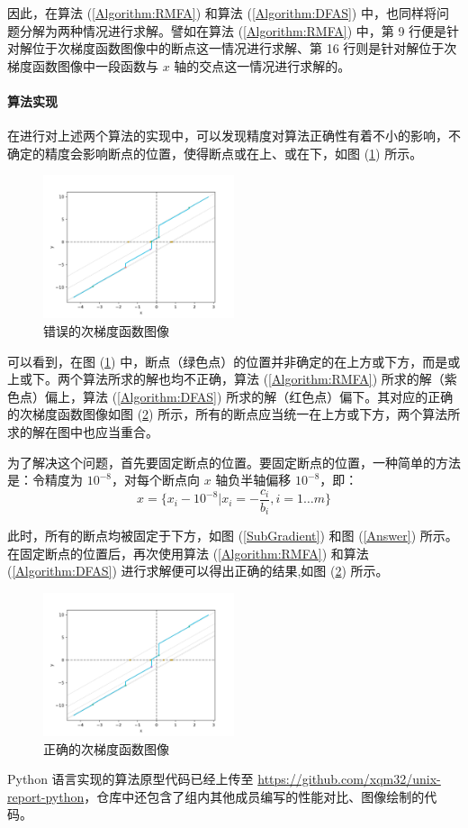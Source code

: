因此，在算法 (\ref{Algorithm:RMFA}) 和算法 (\ref{Algorithm:DFAS}) 中，也同样将问题分解为两种情况进行求解。譬如在算法 (\ref{Algorithm:RMFA}) 中，第 9 行便是针对解位于次梯度函数图像中的断点这一情况进行求解、第 16 行则是针对解位于次梯度函数图像中一段函数与 $x$ 轴的交点这一情况进行求解的。

\paragraph{算法实现}

在进行对上述两个算法的实现中，可以发现精度对算法正确性有着不小的影响，不确定的精度会影响断点的位置，使得断点或在上、或在下，如图 (\ref{Wrong}) 所示。
\begin{figure}[htb]
    \centering
    \includegraphics[width=0.5\textwidth]{figures/Wrong.png}
    \caption{错误的次梯度函数图像}
    \label{Wrong}
\end{figure}

可以看到，在图 (\ref{Wrong}) 中，断点（绿色点）的位置并非确定的在上方或下方，而是或上或下。两个算法所求的解也均不正确，算法 (\ref{Algorithm:RMFA}) 所求的解（紫色点）偏上，算法 (\ref{Algorithm:DFAS}) 所求的解（红色点）偏下。其对应的正确的次梯度函数图像如图 (\ref{Correct}) 所示，所有的断点应当统一在上方或下方，两个算法所求的解在图中也应当重合。

为了解决这个问题，首先要固定断点的位置。要固定断点的位置，一种简单的方法是：令精度为 $10^{-8}$，对每个断点向 $x$ 轴负半轴偏移 $10^{-8}$，即：
\begin{equation}
    x=\{x_i-10^{-8}|x_i=-\frac{c_i}{b_i},i=1\dots m\}\nonumber
\end{equation}

此时，所有的断点均被固定于下方，如图 (\ref{SubGradient}) 和图 (\ref{Answer}) 所示。在固定断点的位置后，再次使用算法 (\ref{Algorithm:RMFA}) 和算法 (\ref{Algorithm:DFAS}) 进行求解便可以得出正确的结果,如图 (\ref{Correct}) 所示。
\begin{figure}[htb]
    \centering
    \includegraphics[width=0.5\textwidth]{figures/Correct.png}
    \caption{正确的次梯度函数图像}
    \label{Correct}
\end{figure}

Python 语言实现的算法原型代码已经上传至 \href{https://github.com/xqm32/unix-report-python}{https://github.com/xqm32/unix-report-python}，仓库中还包含了组内其他成员编写的性能对比、图像绘制的代码。